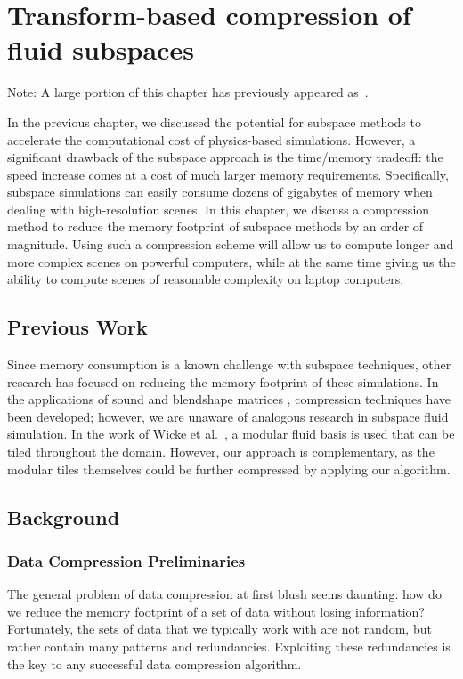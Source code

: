 \chapter[Transform-based compression of fluid subspaces]{Transform-based compression of fluid subspaces}
\label{chap:chap4}
Note: A large portion of this chapter has previously appeared as~\cite{Jones:2016:CFS}.
\bigskip\bigskip

In the previous chapter, we discussed the potential for subspace methods to accelerate the computational cost of physics-based simulations. However, a significant drawback of the subspace approach is the time/memory tradeoff: the speed increase comes at a cost of much larger memory requirements. Specifically, subspace simulations can easily consume dozens of gigabytes of memory when dealing with high-resolution scenes. In this chapter, we discuss a compression method to reduce the memory footprint of subspace methods by an order of magnitude. Using such a compression scheme will allow us to compute longer and more complex scenes on powerful computers, while at the same time giving us the ability to compute scenes of reasonable complexity on laptop computers.

\section{Previous Work}
Since memory consumption is a known challenge with subspace techniques, other research has focused on reducing the memory footprint of these simulations. In the applications of sound \cite{Langlois:2014:ECM} and blendshape matrices \cite{Seo:2011:CDM}, compression techniques have been developed; however, we are unaware of analogous research in subspace fluid simulation. In the work of Wicke et al.~\cite{Wicke:2009}, a modular fluid basis is used that can be tiled throughout the domain. However, our approach is complementary, as the modular tiles themselves could be further compressed by applying our algorithm.

\section{Background}
\subsection{Data Compression Preliminaries}
The general problem of data compression at first blush seems daunting: how do we reduce the memory footprint of a set of data without losing information? Fortunately, the sets of data that we typically work with are not random, but rather contain many patterns and redundancies. Exploiting these redundancies is the key to any successful data compression algorithm.

